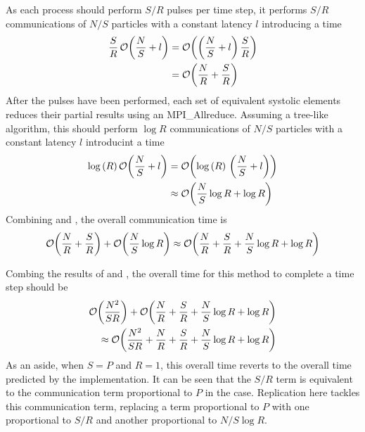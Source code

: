 %
As each process should perform $S/R$ pulses per time step, it performs
$S/R$ communications of $N/S$ particles with a constant latency $l$
introducing a time
\begin{equation}
    \label{eqn:replicated_systolic_pair_operation_pulse_time}
    \begin{split}
        \frac{S}{R}\,\mathcal{O}{\left({ \frac{N}{S} + l }\right)}
            &= \mathcal{O}{\left({ \left(\frac{N}{S} + l\right)\frac{S}{R} }\right)} \\
            &= \mathcal{O}{\left({ \frac{N}{R} + \frac{S}{R} }\right)}
    \end{split}
\end{equation}
%
After the pulses have been performed, each set of equivalent systolic
elements reduces their partial results using an MPI\_Allreduce.
%
Assuming a tree-like algorithm, this should perform $\log{R}$ communications
of $N/S$ particles with a constant latency $l$ introducint a time
\begin{equation}
    \label{eqn:replicated_systolic_pair_operation_reduce_time}
    \begin{split}
        \log{(R)}\,\mathcal{O}{\left({ \frac{N}{S} + l }\right)}
            &= \mathcal{O}{\left({ \log{(R)}\, \left(\frac{N}{S} + l\right) }\right)} \\
            &\approx{} \mathcal{O}{\left({ \frac{N}{S}\log{R} + \log{R} }\right)}
    \end{split}
\end{equation}
%
Combining
 and
,
the overall communication time is
\begin{equation}
    \label{eqn:replicated_systolic_pair_operation_communication_time}
    \mathcal{O}{\left({ \frac{N}{R} + \frac{S}{R} }\right)} + \mathcal{O}{\left({ \frac{N}{S}\log{R} }\right)}
        \approx{}
        \mathcal{O}{\left({ \frac{N}{R} + \frac{S}{R} + \frac{N}{S}\log{R} + \log{R} }\right)}
\end{equation}

%
Combing the results of 
 and
,
the overall time for this method to complete a time step should be
\begin{equation}
    \label{eqn:replicated_systolic_pair_operation_overall_time}
    \begin{split}
    \mathcal{O}{\left({ \frac{N^2}{SR} }\right)}
        + \mathcal{O}{\left({ \frac{N}{R} + \frac{S}{R} + \frac{N}{S}\log{R} + \log{R} }\right)} \\
        \approx{} \mathcal{O}{\left({ \frac{N^2}{SR}
        + \frac{N}{R} + \frac{S}{R} + \frac{N}{S}\log{R} + \log{R} }\right)}
    \end{split}
\end{equation}
%
As an aside, when $S = P$ and $R = 1$, this overall time reverts
to the overall time predicted by the \systolicloop{} implementation.
%
It can be seen that the $S/R$ term is equivalent to the communication
term proportional to $P$ in the \systolicloop{} case.
%
Replication here tackles this communication term, replacing a term
proportional to $P$ with one proportional to $S/R$ and another
proportional to $N/S\log{R}$.


